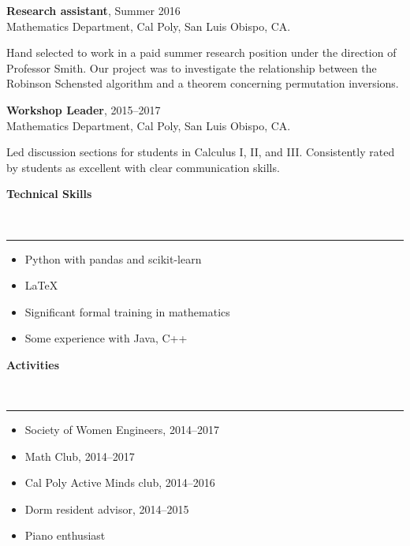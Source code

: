 \documentclass{article}
\newcommand{\sectionrule}[1]{\bigskip \smallskip
{\color{green} \begin{large} \textbf{#1} \end{large}} \\[-1.5ex]
{\color{gold} \rule{.8\textwidth}{.1mm}}
\smallbreak}
\begin{document}
\textbf{Research assistant}, Summer 2016 \\
Mathematics Department, Cal Poly, San Luis Obispo, CA.

\smallskip

Hand selected to work in a paid summer research position under the direction of Professor Smith.
Our project was to investigate the relationship between the Robinson Schensted algorithm and
a theorem concerning permutation inversions.

\bigskip

\textbf{Workshop Leader}, 2015--2017 \\
Mathematics Department, Cal Poly, San Luis Obispo, CA.

\smallskip

Led discussion sections for students in Calculus I, II, and III.  Consistently rated by students
as excellent with clear communication skills.

\sectionrule{Technical Skills}

\begin{itemize}
\item Python with pandas and scikit-learn
\item \LaTeX{}
\item Significant formal training in mathematics
\item Some experience with Java, C++
\end{itemize}

\sectionrule{Activities}

\begin{itemize}
\item Society of Women Engineers, 2014--2017
\item Math Club, 2014--2017
\item Cal Poly Active Minds club, 2014--2016
\item Dorm resident advisor, 2014--2015
\item Piano enthusiast
\end{itemize}
\end{document}
